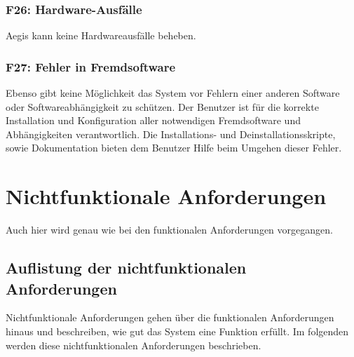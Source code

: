 \documentclass[../review_3.tex]{subfiles}
\begin{document}
\subsubsection{F26: Hardware-Ausfälle}
Aegis kann keine Hardwareausfälle beheben.

\subsubsection{F27: Fehler in Fremdsoftware}
Ebenso gibt keine Möglichkeit das System vor Fehlern einer anderen Software oder Softwareabhängigkeit zu schützen. Der Benutzer ist für die korrekte Installation und Konfiguration aller notwendigen Fremdsoftware und Abhängigkeiten verantwortlich. Die Installations- und Deinstallationsskripte, sowie Dokumentation bieten dem Benutzer Hilfe beim Umgehen dieser Fehler.


\section{Nichtfunktionale Anforderungen}

Auch hier wird genau wie bei den funktionalen Anforderungen vorgegangen.

\subsection{Auflistung der nichtfunktionalen Anforderungen}

Nichtfunktionale Anforderungen gehen über die funktionalen Anforderungen hinaus und beschreiben, wie gut das System eine Funktion erfüllt. Im folgenden werden diese nichtfunktionalen Anforderungen beschrieben.
\end{document}
